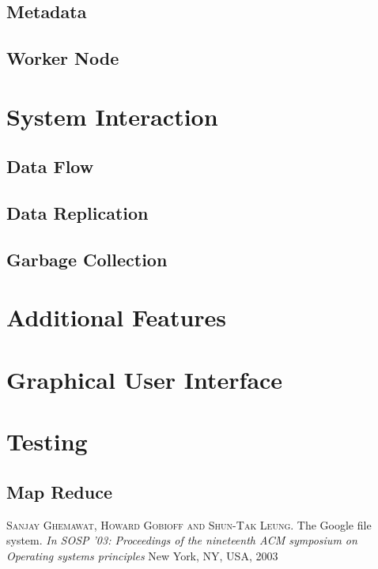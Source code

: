 \documentclass[a4paper,12pt]{article}
\begin{document}
\subsection{Metadata}
\subsection{Worker Node}

\section{System Interaction}
\subsection{Data Flow}
\subsection{Data Replication}
\subsection{Garbage Collection}

\section{Additional Features}

\section{Graphical User Interface}

\section{Testing}
\subsection{Map Reduce}

\begin{thebibliography}{9}
  \textsc{Sanjay Ghemawat, Howard Gobioff and Shun-Tak Leung}.
  The Google file system.
  \emph{In SOSP '03: Proceedings of the nineteenth ACM symposium on Operating systems principles}
  New York, NY, USA, 2003
\end{thebibliography}
\end{document}
